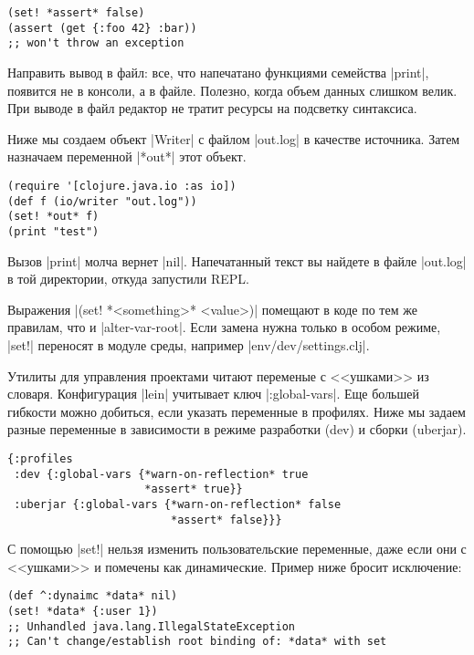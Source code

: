 \begin{verbatim}
(set! *assert* false)
(assert (get {:foo 42} :bar))
;; won't throw an exception
\end{verbatim}

Направить вывод в файл: все, что напечатано функциями семейства \spverb|print|,
появится не в консоли, а в файле. Полезно, когда объем данных слишком велик. При
выводе в файл редактор не тратит ресурсы на подсветку синтаксиса.

Ниже мы создаем объект \spverb|Writer| с файлом \spverb|out.log| в качестве
источника. Затем назначаем переменной \spverb|*out*| этот объект.


\begin{verbatim}
(require '[clojure.java.io :as io])
(def f (io/writer "out.log"))
(set! *out* f)
(print "test")
\end{verbatim}

Вызов \spverb|print| молча вернет \spverb|nil|. Напечатанный текст вы найдете в
файле \spverb|out.log| в той директории, откуда запустили REPL.

Выражения \spverb|(set! *<something>* <value>)| помещают в коде по тем же
правилам, что и \spverb|alter-var-root|. Если замена нужна только в особом
режиме, \spverb|set!| переносят в модуле среды, например
\spverb|env/dev/settings.clj|.

Утилиты для управления проектами читают переменые с <<ушками>> из
словаря. Конфигурация \spverb|lein| учитывает ключ \spverb|:global-vars|. Еще
большей гибкости можно добиться, если указать переменные в профилях. Ниже мы
задаем разные переменные в зависимости в режиме разработки (dev) и сборки
(uberjar).

\begin{verbatim}
{:profiles
 :dev {:global-vars {*warn-on-reflection* true
                     *assert* true}}
 :uberjar {:global-vars {*warn-on-reflection* false
                         *assert* false}}}
\end{verbatim}

С помощью \spverb|set!| нельзя изменить пользовательские переменные, даже если
они с <<ушками>> и помечены как динамические. Пример ниже бросит исключение:

\begin{verbatim}
(def ^:dynaimc *data* nil)
(set! *data* {:user 1})
;; Unhandled java.lang.IllegalStateException
;; Can't change/establish root binding of: *data* with set
\end{verbatim}

